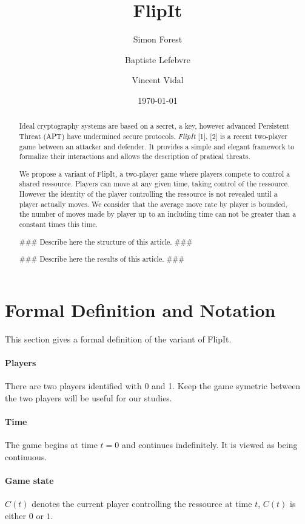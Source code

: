 \documentclass[a4paper]{article}
\title{FlipIt}
\author{Simon Forest \and Baptiste Lefebvre \and Vincent Vidal}
\date{\today}
\begin{document}
\maketitle

\begin{abstract}
Ideal cryptography systems are based on a secret, a key, however advanced Persistent
Threat (APT) have undermined secure protocols. \emph{FlipIt} [1], [2] is a recent
two-player game between an attacker and defender. It provides a simple and elegant
framework to formalize their interactions and allows the description of pratical
threats.

We propose a variant of FlipIt, a two-player game where players compete to control
a shared ressource. Players can move at any given time, taking control of the
ressource. However the identity of the player controlling the ressource is not
revealed until a player actually moves. We consider that the average move rate by
player is bounded, the number of moves made by player up to an including time can
not be greater than a constant times this time.

\#\#\# Describe here the structure of this article. \#\#\#

\#\#\# Describe here the results of this article. \#\#\#
\end{abstract}

\section{Formal Definition and Notation}
This section gives a formal definition of the variant of FlipIt.

\paragraph{Players}
There are two players identified with 0 and 1. Keep the game symetric between the
two players will be useful for our studies.

\paragraph{Time}
The game begins at time $ t = 0 $ and continues indefinitely. It is viewed as being
continuous.

\paragraph{Game state}
$ C \left( t \right) $ denotes the current player controlling the ressource at
time $ t $, $ C \left( t \right) $ is either $ 0 $ or $ 1 $.
\end{document}
